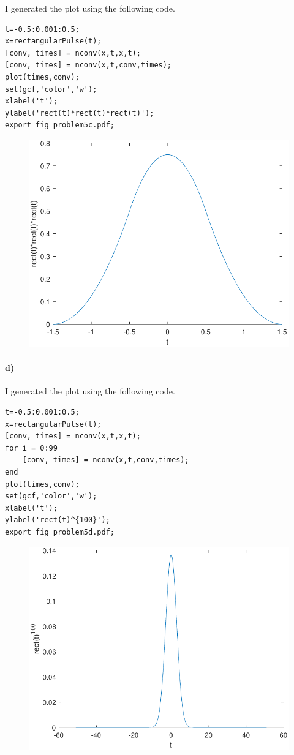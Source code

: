 \documentclass[12pt]{article}
\begin{document}
I generated the plot using the following code.
\begin{verbatim}
t=-0.5:0.001:0.5;
x=rectangularPulse(t);
[conv, times] = nconv(x,t,x,t);
[conv, times] = nconv(x,t,conv,times);
plot(times,conv);
set(gcf,'color','w');
xlabel('t');
ylabel('rect(t)*rect(t)*rect(t)');
export_fig problem5c.pdf;
\end{verbatim}
\begin{figure}[H]
    \begin{center}
        \includegraphics[width=4.5in]{problem5c.pdf}
    \end{center}
\end{figure}

\pagebreak

\paragraph{d)}

I generated the plot using the following code.
\begin{verbatim}
t=-0.5:0.001:0.5;
x=rectangularPulse(t);
[conv, times] = nconv(x,t,x,t);
for i = 0:99
    [conv, times] = nconv(x,t,conv,times);
end
plot(times,conv);
set(gcf,'color','w');
xlabel('t');
ylabel('rect(t)^{100}');
export_fig problem5d.pdf;
\end{verbatim}
\begin{figure}[H]
    \begin{center}
        \includegraphics[width=4.5in]{problem5d.pdf}
    \end{center}
\end{figure}
\end{document}
